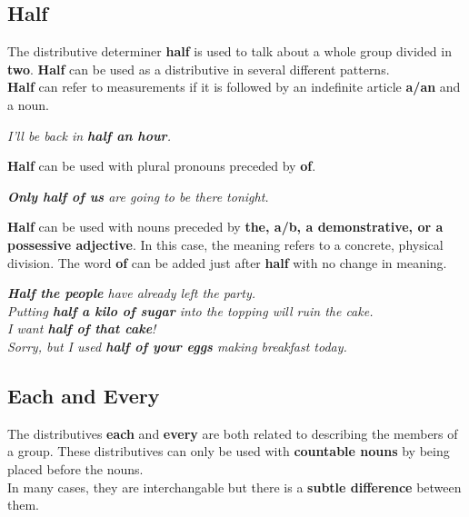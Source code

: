 \documentclass[hidelinks,10pt,a4paper]{article}
\begin{document}
\subsection{Half}
The distributive determiner \textbf{half} is used to talk about a whole group divided in \textbf{two}. \textbf{Half} can be used as a distributive in several different patterns.\\
\textbf{Half} can refer to measurements if it is followed by an indefinite article \textbf{a/an} and a noun.
\begin{center}
\textit{I'll be back in \textbf{half an hour}.}
\end{center}
\textbf{Half} can be used with plural pronouns preceded by \textbf{of}.
\begin{center}
\textit{ \textbf{Only half of us} are going to be there tonight.}
\end{center}
\textbf{Half} can be used with nouns preceded by \textbf{the, a/b, a demonstrative, or a possessive adjective}. In this case, the meaning refers to a concrete, physical division.
The word \textbf{of} can be added just after \textbf{half} with no change in meaning.
\begin{center}
\textit{ \textbf{Half the people} have already left the party.\\
Putting \textbf{half a kilo of sugar} into the topping will ruin the cake.\\
I want \textbf{half of that cake}!\\
Sorry, but I used \textbf{half of your eggs} making breakfast today.}
\end{center}

\subsection{Each and Every}
The distributives \textbf{each} and \textbf{every} are both related to describing the members of a group. These distributives can only be used with \textbf{countable nouns} by being placed before the nouns. \\
\indent In many cases, they are interchangable but there is a \textbf{subtle difference} between them.
\end{document}
